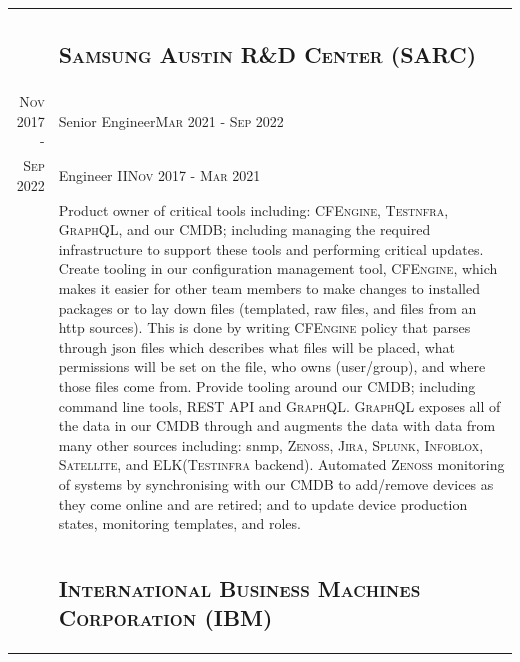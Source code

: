 \documentclass[letterpaper,10pt]{article}
\begin{document}
\begin{tabular}{R|B}
	                              & \subsection{\textsc{Samsung Austin R\&D Center (SARC)}}                                                                \\
	\textsc{Nov} 2017 -           & Senior Engineer\hfill\small{\textsc{Mar} 2021 - \textsc{Sep} 2022}                                                     \\
	\textsc{Sep} 2022\phantom{ -} & Engineer II\hfill\small{\textsc{Nov} 2017 - \textsc{Mar} 2021}                                                         \\
	                              & \footnotesize Product owner of critical tools including: \textsc{CFEngine, Testnfra, GraphQL},
	and our CMDB; including managing the required infrastructure to support these tools and performing 	critical updates.
	Create tooling in our configuration management tool, \textsc{CFEngine}, which makes it easier for other team members
	to make changes to installed packages or to lay down files (templated, raw files, and files from an http sources).
	This is done by writing \textsc{CFEngine} policy that parses through json files which describes what files will be placed,
	what permissions will be set on the file, who owns (user/group), and where those files come from. Provide tooling around our CMDB;
	including command line tools, REST API and \textsc{GraphQL}. \textsc{GraphQL} exposes all of the data in our CMDB through and
	augments the data with data from many other sources including: snmp, \textsc{Zenoss, Jira, Splunk, Infoblox, Satellite},
	and \textsc{ELK}(\textsc{Testinfra} backend). Automated \textsc{Zenoss} monitoring of systems by synchronising with our
	CMDB to add/remove devices as they come online and are retired; and to update device production states, monitoring templates,
	and roles.                                                                                                                                             \\
	                                                                                                                                   \\

	                              & \subsection{\textsc{International Business Machines Corporation (IBM)}}                                                \\


\end{tabular}
\end{document}
